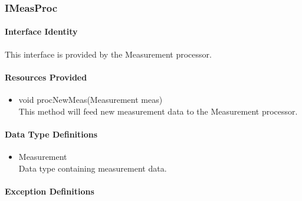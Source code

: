 \subsubsection{IMeasProc}
\paragraph{Interface Identity}
This interface is provided by the Measurement processor.
\paragraph{Resources Provided}
\begin{itemize}
	\item{void procNewMeas(Measurement meas)}\\
	This method will feed new measurement data to the
		Measurement processor.
\end{itemize}
\paragraph{Data Type Definitions}
\begin{itemize}
	\item Measurement\\
	Data type containing measurement data.
\end{itemize}
\paragraph{Exception Definitions}
